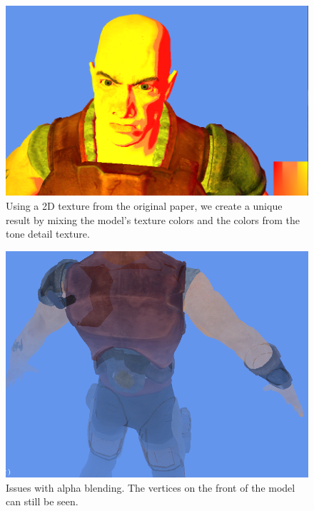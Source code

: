 \documentclass[annual]{acmsiggraph}
\begin{document}
\begin{figure}[h]
  \centering
  \includegraphics[width=5.5in]{images/test}
  \caption{Using a 2D texture from the original paper, we create a unique result by mixing the model's texture colors and the colors from the tone detail texture.}
\end{figure}

\begin{figure}[h]
 \centering
 \includegraphics[width=5.5in]{images/alpha_issues}
 \caption{Issues with alpha blending. The vertices on the front of the model can still be seen.}
 \label{fig:alpha_issue}
\end{figure}
\end{document}
